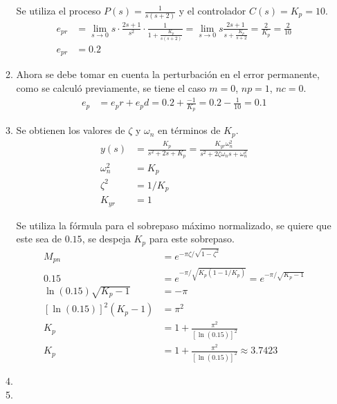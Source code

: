 \begin{ejercicio}
\begin{enumerate}
\begin{enumerate}
      Se utiliza el proceso $P(s)=\frac{1}{s(s+2)}$ y el controlador $C(s)=K_p=10$.
      \begin{align*}
        e_{pr} &= \lim_{s\rightarrow 0} s \cdot \frac{2s+1}{s^2} \cdot \frac{1}{1+\frac{K_p}{s(s+2)}}
        =
        \lim_{s\rightarrow 0} s\frac{2s+1}{s+\frac{K_p}{s+2}}
        = \frac{2}{K_p} = \frac{2}{10}
        \\
        e_{pr} &= 0.2
      \end{align*}

      \item %
      Ahora se debe tomar en cuenta la perturbación en el error permanente, como se calculó previamente, se tiene el caso $m=0$, $np=1$, $nc=0$.
      \begin{align*}
        e_p &= e_pr + e_pd = 0.2 + \frac{-1}{K_p} = 0.2 - \frac{1}{10} = 0.1
      \end{align*}

      \item %
      Se obtienen los valores de $\zeta$ y $\omega_n$ en términos de $K_p$.
      \begin{align*}
        y(s) &= \frac{K_p}{s^2+2s+K_p} = \frac{K_{yr}\omega_n^2}{s^2+ 2\zeta \omega_n s + \omega_n^2}
        \\
        \omega_n^2 &= K_p
        \\
        \zeta^2 &= 1/K_p
        \\
        K_{yr} &= 1
      \end{align*}

      Se utiliza la fórmula para el sobrepaso máximo normalizado, se quiere que este sea de $0.15$, se despeja $K_p$ para este sobrepaso.
      \begin{align*}
        M_{pn} &= e^{-\pi\zeta/\sqrt{1-\zeta^2}}
        \\
        0.15 &= e^{-\pi/\sqrt{K_p(1-1/K_p)}} = e^{-\pi/\sqrt{K_p-1}}
        \\
        \ln(0.15)\sqrt{K_p-1} &= -\pi
        \\
        [\ln(0.15)]^2 (K_p-1) &= \pi^2
        \\
        K_p &= 1 + \frac{\pi^2}{[\ln(0.15)]^2}
        \\
        K_p &= 1 + \frac{\pi^2}{[\ln(0.15)]^2} \approx 3.7423
      \end{align*}

      \item %
      \item %
    \end{enumerate}
  \end{enumerate}

\end{ejercicio}